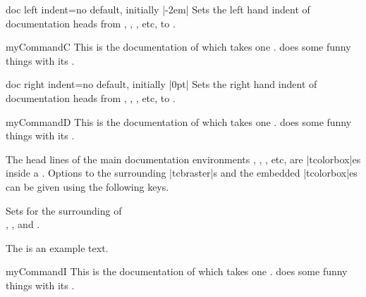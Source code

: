 \begin{docTcbKey}{doc left indent}{=}{no default, initially |-2em|}
  Sets the left hand indent of documentation heads from
  , , , etc, to .
\begin{dispExample}
\begin{docCommand*}[doc left indent=2cm]{myCommandC}{}
  This is the documentation of  which takes one .
   does some funny things with its .
\end{docCommand*}
\end{dispExample}
\end{docTcbKey}


\begin{docTcbKey}{doc right indent}{=}{no default, initially |0pt|}
  Sets the right hand indent of documentation heads from
  , , , etc, to .
\begin{dispExample}
\begin{docCommand*}[doc right indent=-10mm,doc right=10mm,
    doc description=test value]{myCommandD}{}
  This is the documentation of  which takes one .
   does some funny things with its .
\end{docCommand*}
\end{dispExample}
\end{docTcbKey}

\clearpage
The head lines of the main documentation environments ,
, , etc, are |tcolorbox|es inside a
.
Options to the surrounding |tcbraster|s and the embedded
|tcolorbox|es can be given using the following keys.


\begin{docTcbKeys}[
  doc name        = doc raster command,
  doc parameter   = {=\meta{options}},
  doc description = {no default, initially empty},
  doc new         = 2020-04-24,
]{}
  Sets  for the surrounding  of\\
  , , and .

\begin{dispExample}

The is an example text.

\begin{docCommand*}{myCommandI}{}
  This is the documentation of  which takes one .
   does some funny things with its .
\end{docCommand*}
\end{dispExample}

\end{docTcbKeys}


